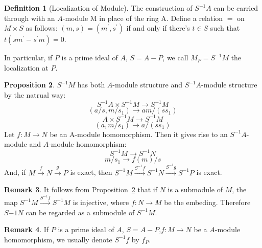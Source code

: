 \documentclass[a4paper,12pt]{article}
\newcommand{\p}{^{\prime}}
\theoremstyle{definition}
\newtheorem{defn}{Definition}[subsection]
\newtheorem{rema}[defn]{Remark}
\newtheorem{prop}[defn]{Proposition}
\begin{document}
\begin{defn}[Localization of Module]
    The construction of $S^{-1}A$ can be carried through with an $A$-module M in
    place of the ring A. Define a relation $=$ on $M\times S$ as follows:
    $(m,s)=(m\p,s\p)$ if and only if there's $t\in S$ such that $t(sm\p -s\p m)=0$.

    In particular, if $P$ is a prime ideal of $A$, $S=A-P$, we call $M_P=S^{-1}M$ the localization at $P$.
\end{defn}
\begin{prop}
    $S^{-1}M$ has both $A$-module structure and $S^{-1}A$-module structure by the natrual way:
    \begin{equation*}
        S^{-1}A\times S^{-1}M \rightarrow S^{-1}M
    \end{equation*}
    \begin{equation*}
        (a/s,m/s_1)\rightarrow am/(ss_1)
    \end{equation*}
    \begin{equation*}
        A\times S^{-1}M \rightarrow S^{-1}M
    \end{equation*}
    \begin{equation*}
        (a,m/s_1)\rightarrow a/(ss_1)
    \end{equation*}
    Let $f:M\rightarrow N$ be an A-module homomorphism. Then it gives rise to an
    $S^{-1}A$-module and $A$-module homomorphism:
    \begin{equation*}
        S^{-1}M \rightarrow S^{-1}N
    \end{equation*}
    \begin{equation*}
        m/s_1 \rightarrow f(m)/s
    \end{equation*}
    And, if $M\xrightarrow{f}N\xrightarrow{g}P$ is exact, then $S^{-1}M\xrightarrow{S^{-1}f}S^{-1}N\xrightarrow{S^{-1}g}S^{-1}P$ is exact.
    \label{proposition:localization is exact}
\end{prop}
\begin{rema}
    It follows from Proposition~\ref{proposition:localization is exact} that if $N$ is a submodule of $M$, the map $S^{-1}M\xrightarrow{S^{-1}f} S^{-1}M $ is injective, where $f:N\rightarrow M$ be the embeding. Therefore $S{-1}N$
    can be regarded as a submodule of $S^{-1}M$.
\end{rema}
\begin{rema}
    If $P$ is a prime ideal of $A$, $S=A-P$,$f:M\rightarrow N$ be a $A$-module homomorphism, we usually denote $S^{-1}f$ by $f_P$.
\end{rema}
\end{document}
